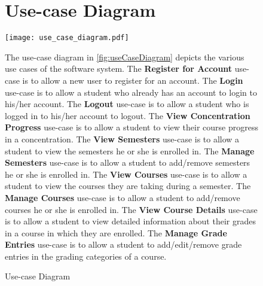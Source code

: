 \documentclass[12pt]{article}
\begin{document}


\begin{figure}[p!]
  \section{Use-case Diagram}
  \centering
  \texttt{[image: use\_case\_diagram.pdf]}
  \caption{Use-case Diagram}
  \label{fig:useCaseDiagram}
  \newcommand{\usecaseall}{use-case is to allow }
  \begin{justify}
    The use-case diagram in \autoref{fig:useCaseDiagram} depicts the various use cases of the
    software system. The \textbf{Register for Account} \usecaseall a new user to register for an
    account. The \textbf{Login} \usecaseall a student who already has an account to login to his/her
    account. The \textbf{Logout} \usecaseall a student who is logged in to his/her account to
    logout. The \textbf{View Concentration Progress} \usecaseall a student to view their course
    progress in a concentration. The \textbf{View Semesters} \usecaseall a student to view the
    semesters he or she is enrolled in. The \textbf{Manage Semesters} \usecaseall a student to
    add/remove semesters he or she is enrolled in. The \textbf{View Courses} \usecaseall a student
    to view the courses they are taking during a semester. The \textbf{Manage Courses} \usecaseall a
    student to add/remove courses he or she is enrolled in. The \textbf{View Course Details}
    \usecaseall a student to view detailed information about their grades in a course in which they
    are enrolled. The \textbf{Manage Grade Entries} \usecaseall a student to add/edit/remove grade
    entries in the grading categories of a course.
  \end{justify}
\end{figure}
\end{document}
